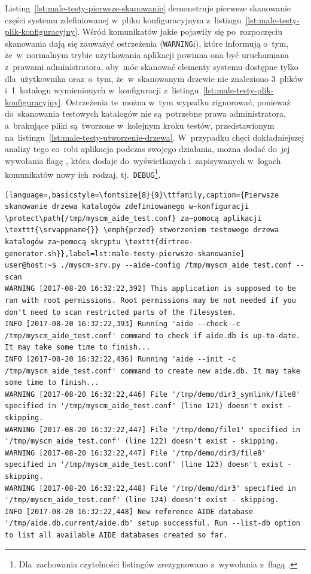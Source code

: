 \documentclass[thesis]{subfiles}
\begin{document}
Listing~\ref{lst:male-testy-pierwsze-skanowanie} demonstruje pierwsze skanowanie części systemu zdefiniowanej w~pliku konfiguracyjnym  z~listingu~\ref{lst:male-testy-plik-konfiguracyjny}. Wśród komunikatów jakie pojawiły się po~rozpoczęciu skanowania dają się zauważyć ostrzeżenia (\texttt{WARNING}i), które informują o~tym, że~w~normalnym trybie użytkowania aplikacji powinna ona być uruchamiana z~prawami administratora, aby~móc skanować elementy systemu dostępne tylko dla~użytkownika \superuser{} oraz~o~tym, że~w~skanowanym drzewie nie znaleziono 3~plików i~1~katalogu wymienionych w~konfiguracji  z~listingu~\ref{lst:male-testy-plik-konfiguracyjny}. Ostrzeżenia te~można w~tym wypadku zignorować, ponieważ do~skanowania testowych katalogów nie są~potrzebne prawa administratora, a~brakujące pliki są~tworzone w~kolejnym kroku testów, przedstawionym na~listingu~\ref{lst:male-testy-utworzenie-drzewa}. W~przypadku chęci dokładniejszej analizy tego co~robi aplikacja \texttt{\srvappname{}} podczas swojego działania, można dodać do~jej wywołania flagę , która dodaje do~wyświetlanych i~zapisywanych w~logach komunikatów nowy ich~rodzaj, tj.~\texttt{DEBUG}\footnote{Dla~zachowania czytelności listingów zrezygnowano z~wywołania \texttt{\srvappname{}} z~flagą .}.

\begin{lstlisting}[language=,basicstyle=\fontsize{8}{9}\ttfamily,caption={Pierwsze skanowanie drzewa katalogów zdefiniowanego w~konfiguracji \protect\path{/tmp/myscm_aide_test.conf} za~pomocą aplikacji \texttt{\srvappname{}} \emph{przed} stworzeniem testowego drzewa katalogów za~pomocą skryptu \texttt{dirtree-generator.sh}},label=lst:male-testy-pierwsze-skanowanie]
user@host:~$ ./myscm-srv.py --aide-config /tmp/myscm_aide_test.conf --scan
WARNING [2017-08-20 16:32:22,392] This application is supposed to be ran with root permissions. Root permissions may be not needed if you don't need to scan restricted parts of the filesystem.
INFO [2017-08-20 16:32:22,393] Running 'aide --check -c /tmp/myscm_aide_test.conf' command to check if aide.db is up-to-date. It may take some time to finish...
INFO [2017-08-20 16:32:22,436] Running 'aide --init -c /tmp/myscm_aide_test.conf' command to create new aide.db. It may take some time to finish...
WARNING [2017-08-20 16:32:22,446] File '/tmp/demo/dir3_symlink/file8' specified in '/tmp/myscm_aide_test.conf' (line 121) doesn't exist - skipping.
WARNING [2017-08-20 16:32:22,447] File '/tmp/demo/file1' specified in '/tmp/myscm_aide_test.conf' (line 122) doesn't exist - skipping.
WARNING [2017-08-20 16:32:22,447] File '/tmp/demo/dir3/file8' specified in '/tmp/myscm_aide_test.conf' (line 123) doesn't exist - skipping.
WARNING [2017-08-20 16:32:22,448] File '/tmp/demo/dir3' specified in '/tmp/myscm_aide_test.conf' (line 124) doesn't exist - skipping.
INFO [2017-08-20 16:32:22,448] New reference AIDE database '/tmp/aide.db.current/aide.db' setup successful. Run --list-db option to list all available AIDE databases created so far.
\end{lstlisting}
\end{document}
